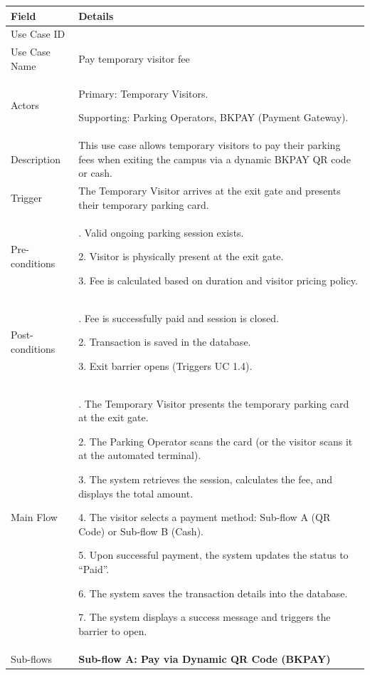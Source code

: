 \begin{table}[H]
\small
\renewcommand{\arraystretch}{1.4}
\begin{tabularx}{\textwidth}{|>{\raggedright\arraybackslash}p{3.5cm}|>{\RaggedRight\arraybackslash}X|}
\hline
\rowcolor{gray!20} \textbf{Field} & \textbf{Details} \\
\hline
Use Case ID & 3.2 \\
\hline
Use Case Name & Pay temporary visitor fee \\
\hline
Actors & Primary: Temporary Visitors. \par Supporting: Parking Operators, BKPAY (Payment Gateway). \\
\hline
Description & This use case allows temporary visitors to pay their parking fees when exiting the campus via a dynamic BKPAY QR code or cash. \\
\hline
Trigger & The Temporary Visitor arrives at the exit gate and presents their temporary parking card. \\
\hline
Pre-conditions & 1. Valid ongoing parking session exists. \par 2. Visitor is physically present at the exit gate. \par 3. Fee is calculated based on duration and visitor pricing policy. \\
\hline
Post-conditions & 1. Fee is successfully paid and session is closed. \par 2. Transaction is saved in the database. \par 3. Exit barrier opens (Triggers UC 1.4). \\
\hline
Main Flow & 
1. The Temporary Visitor presents the temporary parking card at the exit gate. \par
2. The Parking Operator scans the card (or the visitor scans it at the automated terminal). \par
3. The system retrieves the session, calculates the fee, and displays the total amount. \par
4. The visitor selects a payment method: Sub-flow A (QR Code) or Sub-flow B (Cash). \par
5. Upon successful payment, the system updates the status to ``Paid''. \par
6. The system saves the transaction details into the database. \par
7. The system displays a success message and triggers the barrier to open. \\
\hline
Sub-flows & 
\textbf{Sub-flow A: Pay via Dynamic QR Code (BKPAY)} \par

\end{tabularx}
\end{table}
